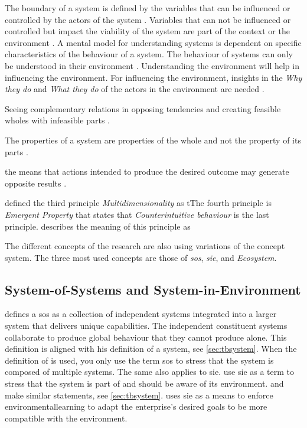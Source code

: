 The boundary of a system is defined by the variables that can be influenced or controlled by the actors of the system \parencite[p.~182]{Gharajedaghi2011}. Variables that can not be influenced or controlled but impact the viability of the system are part of the context \parencite[p.~183]{Gharajedaghi2011} or the environment \parencite[p.~13--14]{Mannaert2016}. A mental model for understanding systems is dependent on specific characteristics of the behaviour of a system. The behaviour of systems can only be understood in their environment \textcite[p.~29]{Gharajedaghi2011}. Understanding the environment will help in influencing the environment. For influencing the environment, insights in the \textit{Why they do} and \textit{What they do} of the actors in the environment are needed \parencite[p.~33]{Gharajedaghi2011}.




Seeing complementary relations in opposing tendencies and creating feasible wholes with infeasible parts \parencite[p.~38]{Gharajedaghi2011}. 

The properties of a system are properties of the whole and not the property of its parts \parencites{Ackoff1973}{Gharajedaghi2011}.



the means that actions intended to produce the desired outcome may generate opposite results \parencite[p.~48]{Gharajedaghi2011}.


 defined the third principle \textit{Multidimensionality} as tThe fourth principle is \textit{Emergent Property} that states that  \textit{Counterintuitive behaviour} is the last principle. describes the meaning of this principle as 

The different concepts of the research are also using variations of the concept system. The three most used concepts are those of \textit{\acrfull{sos}}, \textit{\acrfull{sie}}, and \textit{Ecosystem}.

\subsection{System-of-Systems and System-in-Environment}
\label{sub:tbsysofsys}
\textcite{Incose2018} defines a \acrshort{sos} as a collection of independent systems integrated into a larger system that delivers unique capabilities. The independent constituent systems collaborate to produce global behaviour that they cannot produce alone. This definition is aligned with \textcite[p.~664]{Ackoff1973} his definition of a system, see \cref{sec:tbsystem}. When the definition of \textcites{Ackoff1973}{Gharajedaghi2011} is used, you only use the term \acrshort{sos} to stress that the system is composed of multiple systems. The same also applies to \acrshort{sie}. \textcite{Lapalme2012,Korhonen2016} use \acrshort{sie} as a term to stress that the system is part of and should be aware of its environment. \textcite[p.~13--4]{Mannaert2016} and \textcite[p.~183]{Gharajedaghi2011} make similar statements, see \cref{sec:tbsystem}. \textcite[p.~41]{Lapalme2012} uses \acrshort{sie} as a means to enforce \gls{environmentallearning} to adapt the enterprise’s desired goals to be more compatible with the environment.

